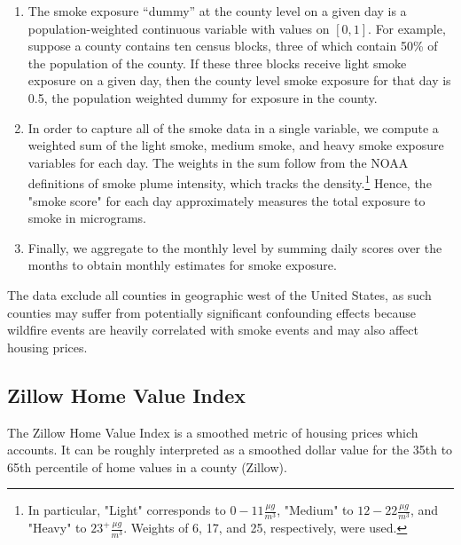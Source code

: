 \documentclass[12pt]{article}
\begin{document}
\begin{enumerate}
\item The smoke exposure ``dummy'' at the county level on a given day is a population-weighted continuous variable with values on $[0,1]$.  For example, suppose a county contains ten census blocks, three of which contain 50\% of the population of the county.  If these three blocks receive light smoke exposure on a given day, then the county level smoke exposure for that day is 0.5, the population weighted dummy for exposure in the county.  
\item In order to capture all of the smoke data in a single variable, we compute a weighted sum of the light smoke, medium smoke, and heavy smoke exposure variables for each day.  The weights in the sum follow from the NOAA definitions of smoke plume intensity, which tracks the density.\footnote{In particular, "Light" corresponds to $0-11\frac{\mu g}{m^3}$, "Medium" to $12-22\frac{\mu g}{m^3}$, and "Heavy" to $23^+\frac{\mu g}{m^3}$.  Weights of 6, 17, and 25, respectively, were used.}  Hence, the "smoke score" for each day approximately measures the total exposure to smoke in micrograms.  
\item Finally, we aggregate to the monthly level by summing daily scores over the months to obtain monthly estimates for smoke exposure.  
\end{enumerate}

The data exclude all counties in geographic west of the United States, as such 
counties may suffer from potentially significant confounding effects because 
wildfire events are heavily correlated with smoke events and may also affect housing prices.

\subsection{Zillow Home Value Index} The Zillow Home Value Index is a smoothed metric of housing prices which accounts.  It can be roughly interpreted as a smoothed dollar value for the 35th to 65th percentile of home values in a county (Zillow).  
\end{document}
